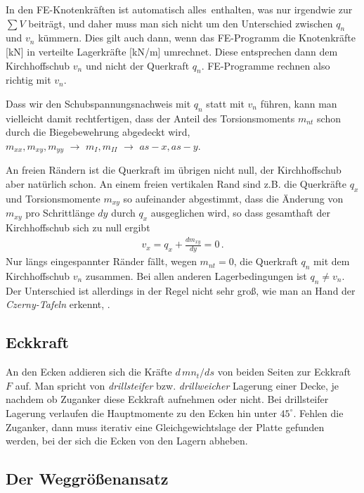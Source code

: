 In den FE-Knotenkr\"{a}ften ist automatisch \glq alles\grq\ enthalten, was nur irgendwie zur $\sum V$ beitr\"{a}gt, und daher muss man sich nicht um den Unterschied zwischen $q_n$ und $v_n$ k\"{u}mmern. Dies gilt auch dann, wenn das FE-Programm die Knotenkr\"{a}fte [kN] in verteilte Lagerkr\"{a}fte [kN/m] umrechnet. Diese entsprechen dann dem Kirchhoffschub $v_n$ und nicht der Querkraft $q_n$. FE-Programme rechnen also richtig mit $v_n$.

Dass wir den Schubspannungsnachweis mit $q_n$ statt mit $v_n$ f\"{u}hren, kann man vielleicht damit rechtfertigen, dass der Anteil des Torsionsmoments $m_{nt}$ schon durch die Biegebewehrung abgedeckt wird, $m_{xx},m_{xy},m_{yy} \,\,\rightarrow\,\,m_I,m_{II}\,\,\rightarrow\,\,as-x, as-y$.

An freien R\"{a}ndern ist die Querkraft im \"{u}brigen nicht null, der Kirchhoffschub aber nat\"{u}rlich schon. An einem freien vertikalen Rand  sind z.B. die Querkr\"{a}fte $q_x$ und Torsionsmomente $m_{xy}$ so aufeinander abgestimmt, dass die \"{A}nderung von $m_{xy}$ pro Schrittl\"{a}nge $dy$ durch $q_x$ ausgeglichen wird, so dass gesamthaft der Kirchhoffschub sich zu null ergibt
\begin{align}
v_x = q_x +  \frac{d m_{xy}}{dy} = 0 \,.
\end{align}
Nur l\"{a}ngs eingespannter R\"{a}nder f\"{a}llt, wegen $m_{nt} = 0$, die Querkraft $q_n$ mit dem Kirchhoffschub $v_n$ zusammen. Bei allen anderen Lagerbedingungen ist $q_n \neq v_n$. Der Unterschied ist allerdings in der Regel nicht sehr gro{\ss}, wie man an Hand der {\em Czerny-Tafeln} erkennt, \cite{Czerny}.



{\textcolor{sectionTitleBlue}{\subsection{Eckkraft}}}
An den Ecken addieren sich die Kr\"{a}fte $d\,mn_t/ds$ von beiden Seiten zur Eckkraft $F$ auf. Man spricht von {\em drillsteifer} bzw. {\em drillweicher} Lagerung einer Decke, je nachdem ob Zuganker diese Eckkraft aufnehmen oder nicht. Bei drillsteifer Lagerung verlaufen die Hauptmomente zu den Ecken hin unter $45^\circ$. Fehlen die Zuganker, dann muss iterativ eine Gleichgewichtslage der Platte gefunden werden, bei der sich die Ecken von den Lagern abheben.

{\textcolor{sectionTitleBlue}{\section{Der Weggr\"{o}{\ss}enansatz}}}\label{Weggroessenansatz}

